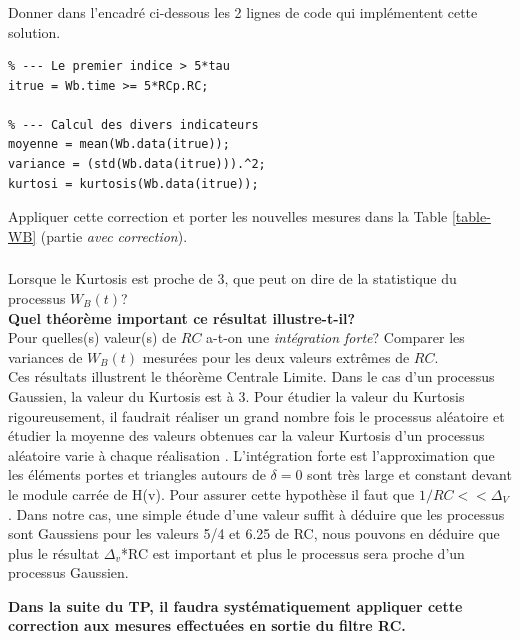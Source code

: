 \documentclass{article}
\begin{document}
\subsubsection{}
Donner dans l'encadré ci-dessous les 2 lignes de code qui implémentent cette solution.

\begin{verbatim}
% --- Le premier indice > 5*tau
itrue = Wb.time >= 5*RCp.RC;

% --- Calcul des divers indicateurs
moyenne = mean(Wb.data(itrue));
variance = (std(Wb.data(itrue))).^2;
kurtosi = kurtosis(Wb.data(itrue));
\end{verbatim}

Appliquer cette correction et porter les nouvelles mesures dans la Table \ref{table-WB} (partie {\em avec correction}).


\subsubsection{}
Lorsque le Kurtosis est proche de $3$, que peut on dire de la statistique du processus $W_B(t)$? \\
\textbf{Quel théorème important ce résultat illustre-t-il?}\\
 Pour quelles(s) valeur(s) de $RC$ a-t-on une {\em intégration forte}?  Comparer les variances de $W_B(t)$ mesurées pour les deux valeurs extrêmes de $RC$. \\
\newline
Ces résultats illustrent le théorème Centrale Limite. Dans le cas d'un processus Gaussien, la valeur du Kurtosis est à 3. Pour étudier la valeur du Kurtosis rigoureusement, il faudrait réaliser un grand nombre fois le processus aléatoire et étudier la moyenne des valeurs obtenues car la valeur Kurtosis d'un processus aléatoire varie à chaque réalisation . 
\newline
L'intégration forte est l'approximation que les éléments portes et triangles autours de $\delta = 0$ sont très large et constant devant le module carrée de H(v). Pour assurer cette hypothèse il faut que $1/RC << \Delta_V$.
\newline
Dans notre cas, une simple étude d'une valeur suffit à déduire que les processus sont Gaussiens pour les valeurs 5/4 et 6.25 de RC, nous pouvons en déduire que plus le résultat $\Delta_v$*RC est important et plus le processus sera proche d'un processus Gaussien. 
\newline

\textbf{Dans la suite du TP, il faudra systématiquement appliquer cette correction aux mesures effectuées en sortie du filtre RC.}
\end{document}

